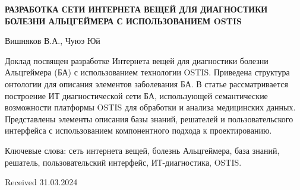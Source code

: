 \documentclass{scndocument}
\begin{document}
\begin{multicols*}{2}
\begingroup
\centering
\textbf{РАЗРАБОТКА СЕТИ ИНТЕРНЕТА ВЕЩЕЙ ДЛЯ ДИАГНОСТИКИ БОЛЕЗНИ АЛЬЦГЕЙМЕРА С ИСПОЛЬЗОВАНИЕМ OSTIS}

\endgroup
\begingroup
\centering
Вишняков В.А., Чуюэ Юй

\endgroup
\vspace{3mm}

Доклад посвящен разработке Интернета вещей для диагностики болезни
Альцгеймера (БА) с использованием
технологии OSTIS. Приведена структура онтологии для
описания элементов заболевания БА. В статье рассматривается построение ИТ
диагностической сети БА, использующей семантические возможности платформы
OSTIS для
обработки и анализа медицинских данных. Представлены
элементы описания базы знаний, решателей и пользовательского интерфейса с использованием компонентного подхода
к проектированию.

Ключевые слова: сеть интернета вещей, болезнь Альцгеймера, база знаний, решатель, пользовательский интерфейс,
ИТ-диагностика, OSTIS.

\begingroup
\raggedleft
Received 31.03.2024

\endgroup

\end{multicols*}
\end{document}
